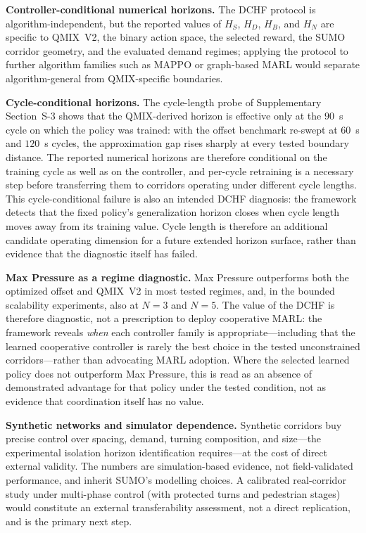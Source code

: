 \documentclass[review,12pt]{elsarticle}
\begin{document}
\textbf{Controller-conditional numerical horizons.} The DCHF protocol is algorithm-independent, but the reported values of $H_S$, $H_D$, $H_B$, and $H_N$ are specific to QMIX~V2, the binary action space, the selected reward, the SUMO corridor geometry, and the evaluated demand regimes; applying the protocol to further algorithm families such as MAPPO or graph-based MARL would separate algorithm-general from QMIX-specific boundaries.

\textbf{Cycle-conditional horizons.} The cycle-length probe of Supplementary Section~S-3 shows that the QMIX-derived horizon is effective only at the $90$~s cycle on which the policy was trained: with the offset benchmark re-swept at $60$~s and $120$~s cycles, the approximation gap rises sharply at every tested boundary distance. The reported numerical horizons are therefore conditional on the training cycle as well as on the controller, and per-cycle retraining is a necessary step before transferring them to corridors operating under different cycle lengths. This cycle-conditional failure is also an intended DCHF diagnosis: the framework detects that the fixed policy's generalization horizon closes when cycle length moves away from its training value. Cycle length is therefore an additional candidate operating dimension for a future extended horizon surface, rather than evidence that the diagnostic itself has failed.

\textbf{Max Pressure as a regime diagnostic.} Max Pressure outperforms both the optimized offset and QMIX~V2 in most tested regimes, and, in the bounded scalability experiments, also at $N=3$ and $N=5$. The value of the DCHF is therefore diagnostic, not a prescription to deploy cooperative MARL: the framework reveals \emph{when} each controller family is appropriate---including that the learned cooperative controller is rarely the best choice in the tested unconstrained corridors---rather than advocating MARL adoption. Where the selected learned policy does not outperform Max Pressure, this is read as an absence of demonstrated advantage for that policy under the tested condition, not as evidence that coordination itself has no value.

\textbf{Synthetic networks and simulator dependence.} Synthetic corridors buy precise control over spacing, demand, turning composition, and size---the experimental isolation horizon identification requires---at the cost of direct external validity. The numbers are simulation-based evidence, not field-validated performance, and inherit SUMO's modelling choices. A calibrated real-corridor study under multi-phase control (with protected turns and pedestrian stages) would constitute an external transferability assessment, not a direct replication, and is the primary next step.
\end{document}

